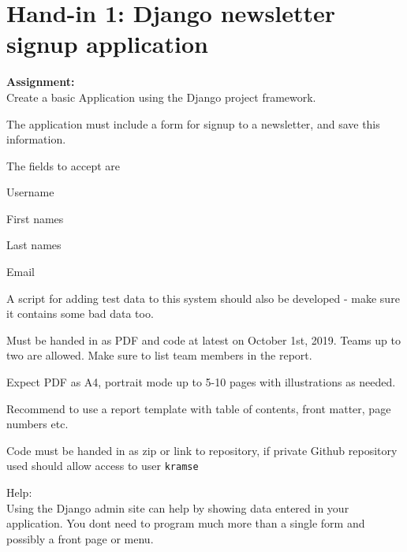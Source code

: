 \documentclass[a4paper,11pt,notitlepage]{report}
\begin{document}
\rm
{}

\newcommand{\emne}[1]{Software Security course}
\newcommand{\kursus}[1]{Software Security course}
\newcommand{\kursusnavn}[1]{Software Security course\\ exercises}




\setcounter{tocdepth}{0}

\normal



\chapter*{Hand-in 1: Django newsletter signup application}

{\bf Assignment:}\\
Create a basic Application using the Django project framework.

The application must include a form for signup to a newsletter, and save this information.

The fields to accept are

\begin{list2}
\item Username
\item First names
\item Last names
\item Email
\end{list2}

A script for adding test data to this system should also be developed - make sure it contains some bad data too.

Must be handed in as PDF and code at latest on October 1st, 2019. Teams up to two are allowed. Make sure to list team members in the report.

Expect PDF as A4, portrait mode up to 5-10 pages with illustrations as needed.

Recommend to use a report template with table of contents, front matter, page numbers etc.

Code must be handed in as zip or link to repository, if private Github repository used should allow access to user \verb+kramse+

Help:\\
Using the Django admin site can help by showing data entered in your application. You dont need to program much more than a single form and possibly a front page or menu.
\end{document}
